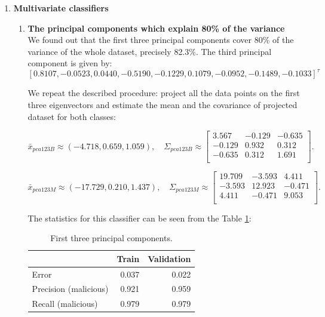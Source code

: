 \documentclass[11pt,a4paper]{article}
\begin{document}
\begin{enumerate}
\begin{enumerate}
		
	\end{enumerate}
	
	\item \textbf{Multivariate classifiers}
	\begin{enumerate}
		\item \textbf{The principal components which explain 80\% of the variance} \\
		We found out that the first three principal components cover 80\% of the variance of the whole dataset, precisely 82.3\%.
		The third principal component is given by:
		$$ [0.8107, -0.0523,  0.0440, -0.5190, -0.1229, 0.1079, -0.0952, -0.1489, -0.1033]^\tau $$
		
		We repeat the described procedure: project all the data points on the first three eigenvectors and estimate the mean and the covariance of projected dataset for both classes:
		
		\[
		\bar{x}_{pca123B} \approx (-4.718, 0.659,  1.059), \quad 
		\Sigma_{pca123B} \approx 
		\begin{bmatrix}
		3.567 & -0.129 & -0.635   \\
		-0.129 & 0.932 & 0.312  \\
		-0.635 & 0.312 & 1.691 \\
		\end{bmatrix}.
		\]
		
		\[
		\bar{x}_{pca123M} \approx (-17.729,  0.210, 1.437), \quad 
		\Sigma_{pca123M} \approx 
		\begin{bmatrix}
		19.709 & -3.593 & 4.411 \\
		-3.593 & 12.923 & -0.471   \\
		4.411 & -0.471 & 9.053 \\
		\end{bmatrix}.
		\]
		
		The statistics for this classifier can be seen from the Table \ref{tab:results-pca-123}:
		
		\begin{table}[H]
			\centering
			\begin{tabular}{lrr}
				\toprule
				& \textbf{Train} & \textbf{Validation}  \\ \midrule
				Error & 0.037 & 0.022 \\	
				Precision (malicious) & 0.921 & 0.959 \\
				Recall (malicious) & 0.979 & 0.979 \\
				\bottomrule
			\end{tabular}
			\caption{First three principal components.}
			\label{tab:results-pca-123}
		\end{table}
		

\end{enumerate}
\end{enumerate}
\end{document}
